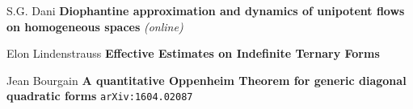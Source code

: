 \documentclass[12pt]{article}
\begin{document}
\newpage

\selectfont \fontsize{12}{10}\selectfont

\begin{thebibliography}{}

\item S.G. Dani \textbf{Diophantine approximation and dynamics of unipotent flows on homogeneous spaces} \textit{(online)}

\item Elon Lindenstrauss \textbf{Effective Estimates on Indefinite Ternary Forms}

\item Jean Bourgain
\textbf{A quantitative Oppenheim Theorem for generic diagonal quadratic forms} \texttt{arXiv:1604.02087}

\end{thebibliography}
\end{document}
